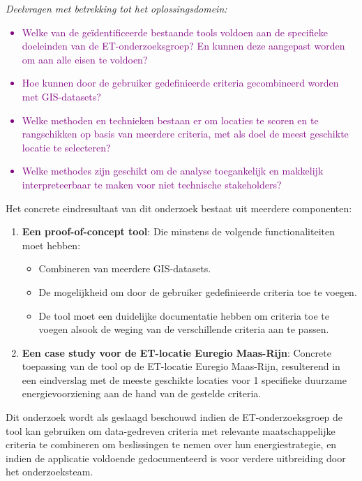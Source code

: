 \textit{Deelvragen met betrekking tot het oplossingsdomein:}
\textcolor{purple}{\begin{itemize}
    \item Welke van de geïdentificeerde bestaande tools voldoen aan de specifieke doeleinden van de ET-\-onderzoeksgroep? En kunnen deze aangepast worden om aan alle eisen te voldoen?
    \item Hoe kunnen door de gebruiker gedefinieerde criteria gecombineerd worden met GIS-datasets?
    \item Welke methoden en technieken bestaan er om locaties te scoren en te rangschikken op basis van meerdere criteria, met als doel de meest geschikte locatie te selecteren?
    \item Welke methodes zijn geschikt om de analyse toegankelijk en makkelijk interpreteerbaar te maken voor niet technische stakeholders?
\end{itemize}}

Het concrete eindresultaat van dit onderzoek bestaat uit meerdere componenten:

\begin{enumerate}
    \item \textbf{Een proof-\-of-\-concept tool}: Die minstens de volgende functionaliteiten moet hebben:
    \begin{itemize}
        \item Combineren van meerdere GIS-\-datasets. 
        \item De mogelijkheid om door de gebruiker gedefinieerde criteria toe te voegen. 
        \item De tool moet een duidelijke documentatie hebben om criteria toe te voegen alsook de weging van de verschillende criteria aan te passen.
    \end{itemize}
    
    \item \textbf{Een case study voor de ET-\-locatie Euregio Maas-\-Rijn}: Concrete toepassing van de tool op de ET-\-locatie Euregio Maas-\-Rijn, resulterend in een eindverslag met de meeste geschikte locaties voor 1 specifieke duurzame energievoorziening aan de hand van de gestelde criteria.

\end{enumerate}

Dit onderzoek wordt als geslaagd beschouwd indien de ET-\-onderzoeksgroep de tool kan gebruiken om data-gedreven criteria met relevante maatschappelijke criteria te combineren om beslissingen te nemen over hun energiestrategie, en indien de applicatie voldoende gedocumenteerd is voor verdere uitbreiding door het onderzoeksteam.

